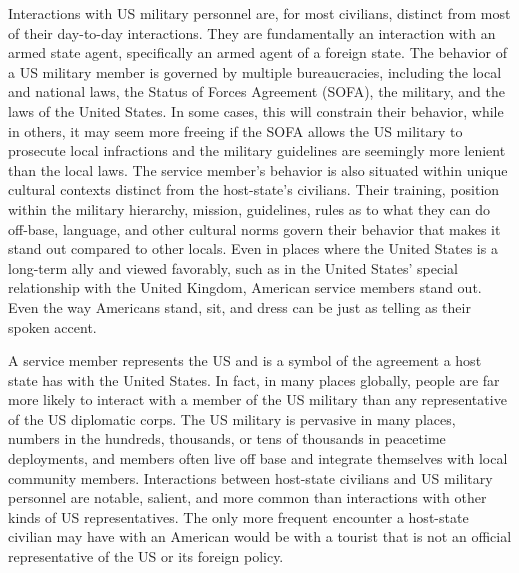 {	%
	
	Interactions with US military personnel are, for most civilians, distinct from most of their day-to-day interactions. They are fundamentally an interaction with an armed state agent, specifically an armed agent of a foreign state. The behavior of a US military member is governed by multiple bureaucracies, including the local and national laws, the Status of Forces Agreement (SOFA), the military, and the laws of the United States. In some cases, this will constrain their behavior, while in others, it may seem more freeing if the SOFA allows the US military to prosecute local infractions and the military guidelines are seemingly more lenient than the local laws. The service member's behavior is also situated within unique cultural contexts distinct from the host-state's civilians. Their training, position within the military hierarchy, mission, guidelines, rules as to what they can do off-base, language, and other cultural norms govern their behavior that makes it stand out compared to other locals. Even in places where the United States is a long-term ally and viewed favorably, such as in the United States' special relationship with the United Kingdom, American service members stand out. Even the way Americans stand, sit, and dress can be just as telling as their spoken accent. 

	
A service member represents the US and is a symbol of the agreement a host state has with the United States. In fact, in many places globally, people are far more likely to interact with a member of the US military than any representative of the US diplomatic corps. The US military is pervasive in many places, numbers in the hundreds, thousands, or tens of thousands in peacetime deployments, and members often live off base and integrate themselves with local community members. Interactions between host-state civilians and US military personnel are notable, salient, and more common than interactions with other kinds of US representatives. The only more frequent encounter a host-state civilian may have with an American would be with a tourist that is not an official representative of the US or its foreign policy.
	
}
